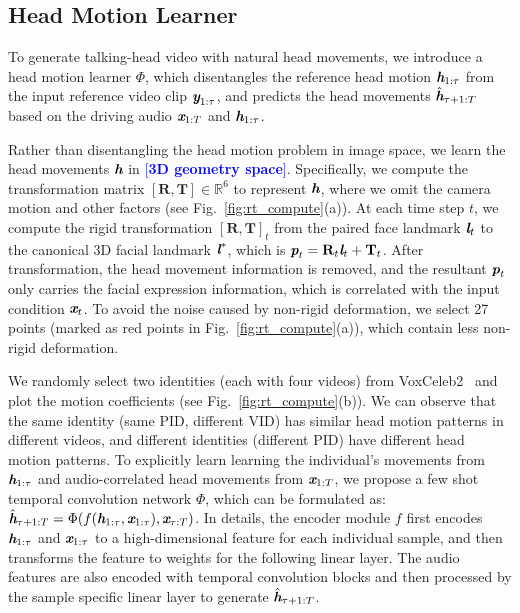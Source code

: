 \documentclass[runningheads]{llncs}
\def\mathbi#1{\textbf{\em #1}}
\providecommand{\lchen}[1]{\textcolor{blue}{[{\bf #1}]}}
\begin{document}
\subsection{Head Motion Learner}
\label{subsec:head_mo}
To generate talking-head video with natural head movements, we introduce a head motion learner $\Phi$, which disentangles the reference head motion ${\mathbi{h}}_{1:\tau}$ from the input reference video clip $\mathbi{y}_{1:\tau}$, and predicts the head movements $\hat{\mathbi{h}}_{\tau +1:T}$ based on the driving audio ${\mathbi{x}}_{1:T}$ and ${\mathbi{h}}_{1:\tau}$.

 \indent Rather than disentangling the head motion problem in image space, we learn the head movements $\mathbi{h}$ in \lchen{3D geometry space}. Specifically, we compute the transformation matrix $[\mathbf{R},\mathbf{T}] \in \mathbb{R}^{6}$ to represent $\mathbi{h}$, where we omit the camera motion and other factors (see Fig.~\ref{fig:rt_compute}(a)). At each time step $t$, we compute the rigid transformation $[\mathbf{R},\mathbf{T}]_t$ from the paired face landmark $\mathbi{l}_t$ to the canonical 3D facial landmark $\mathbi{l}^*$, which is ${\mathbi{p}}_t = \mathbf{R}_t  \mathbi{l}_t + \mathbf{T}_t$. After transformation, the head movement information is removed, and the resultant ${\mathbi{p}}_t$ only carries the facial expression information, which is correlated with the input condition $\mathbi{x}_t$. To avoid the noise caused by non-rigid deformation, we select 27 points (marked as red points in Fig.~\ref{fig:rt_compute}(a)), which contain less non-rigid deformation.
 
 \indent We randomly select two identities (each with four videos) from VoxCeleb2~\cite{Chung18b} and plot the motion coefficients (see Fig.~\ref{fig:rt_compute}(b)). We can observe that the same identity (same PID, different VID) has similar head motion patterns in different videos, and different identities (different PID) have different head motion patterns. To explicitly learn learning the individual's movements from ${\mathbi{h}}_{1:\tau}$ and audio-correlated head movements from ${{\mathbi{x}}}_{1:T}$, we propose a few shot temporal convolution network $\Phi$, which can be formulated as: ${\hat{\mathbi{h}}}_{\tau+1:T} = \Phi( f({{\mathbi{h}}}_{1:\tau}, {{\mathbi{x}}}_{1:\tau}), {{\mathbi{x}}}_{\tau:T})$. In details, the encoder module $f$ first encodes ${\mathbi{h}}_{1:\tau}$ and ${{\mathbi{x}}}_{1:\tau}$ to a high-dimensional feature for each individual sample, and then transforms the feature to weights for the following linear layer. The audio features are also encoded with temporal convolution blocks and then processed by the sample specific linear layer to generate ${\hat{\mathbi{h}}}_{\tau+1:T}$.
 
\end{document}
